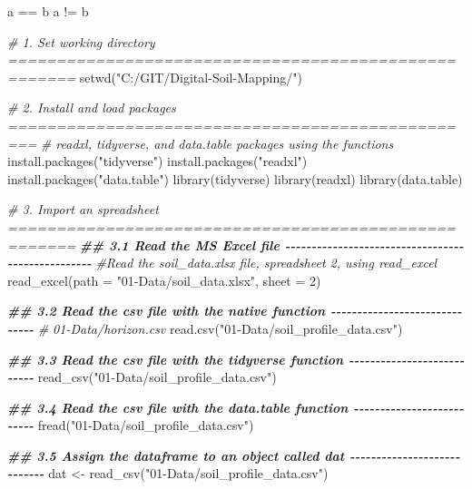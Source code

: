 \documentclass[
  10pt,
  b5paper,
  oneside]{book}
\newenvironment{Shaded}{\begin{snugshade}}{\end{snugshade}}
\newcommand{\AttributeTok}[1]{\textcolor[rgb]{0.77,0.63,0.00}{#1}}
\newcommand{\CommentTok}[1]{\textcolor[rgb]{0.56,0.35,0.01}{\textit{#1}}}
\newcommand{\DecValTok}[1]{\textcolor[rgb]{0.00,0.00,0.81}{#1}}
\newcommand{\DocumentationTok}[1]{\textcolor[rgb]{0.56,0.35,0.01}{\textbf{\textit{#1}}}}
\newcommand{\FunctionTok}[1]{\textcolor[rgb]{0.00,0.00,0.00}{#1}}
\newcommand{\NormalTok}[1]{#1}
\newcommand{\OtherTok}[1]{\textcolor[rgb]{0.56,0.35,0.01}{#1}}
\newcommand{\SpecialCharTok}[1]{\textcolor[rgb]{0.00,0.00,0.00}{#1}}
\newcommand{\StringTok}[1]{\textcolor[rgb]{0.31,0.60,0.02}{#1}}
\begin{document}
\begin{Shaded}
\begin{Highlighting}[]
\NormalTok{a }\SpecialCharTok{==}\NormalTok{ b}
\NormalTok{a }\SpecialCharTok{!=}\NormalTok{ b}

\CommentTok{\# 1. Set working directory ===================================================== }
\FunctionTok{setwd}\NormalTok{(}\StringTok{"C:/GIT/Digital{-}Soil{-}Mapping/"}\NormalTok{)}

\CommentTok{\# 2. Install and load packages =================================================}
\CommentTok{\# readxl, tidyverse, and data.table packages using the functions}
\FunctionTok{install.packages}\NormalTok{(}\StringTok{"tidyverse"}\NormalTok{)}
\FunctionTok{install.packages}\NormalTok{(}\StringTok{"readxl"}\NormalTok{)}
\FunctionTok{install.packages}\NormalTok{(}\StringTok{"data.table"}\NormalTok{)}
\FunctionTok{library}\NormalTok{(tidyverse)}
\FunctionTok{library}\NormalTok{(readxl)}
\FunctionTok{library}\NormalTok{(data.table)}

\CommentTok{\# 3. Import an spreadsheet =====================================================}
\DocumentationTok{\#\# 3.1 Read the MS Excel file {-}{-}{-}{-}{-}{-}{-}{-}{-}{-}{-}{-}{-}{-}{-}{-}{-}{-}{-}{-}{-}{-}{-}{-}{-}{-}{-}{-}{-}{-}{-}{-}{-}{-}{-}{-}{-}{-}{-}{-}{-}{-}{-}{-}{-}{-}{-}{-}{-}{-}}
\CommentTok{\#Read the soil\_data.xlsx file, spreadsheet 2, using read\_excel }
\FunctionTok{read\_excel}\NormalTok{(}\AttributeTok{path =} \StringTok{"01{-}Data/soil\_data.xlsx"}\NormalTok{, }\AttributeTok{sheet =} \DecValTok{2}\NormalTok{)}

\DocumentationTok{\#\# 3.2 Read the csv file with the native function {-}{-}{-}{-}{-}{-}{-}{-}{-}{-}{-}{-}{-}{-}{-}{-}{-}{-}{-}{-}{-}{-}{-}{-}{-}{-}{-}{-}{-}{-}}
\CommentTok{\# 01{-}Data/horizon.csv}
\FunctionTok{read.csv}\NormalTok{(}\StringTok{"01{-}Data/soil\_profile\_data.csv"}\NormalTok{)}

\DocumentationTok{\#\# 3.3 Read the csv file with the tidyverse function {-}{-}{-}{-}{-}{-}{-}{-}{-}{-}{-}{-}{-}{-}{-}{-}{-}{-}{-}{-}{-}{-}{-}{-}{-}{-}{-}}
\FunctionTok{read\_csv}\NormalTok{(}\StringTok{"01{-}Data/soil\_profile\_data.csv"}\NormalTok{)}

\DocumentationTok{\#\# 3.4 Read the csv file with the data.table function {-}{-}{-}{-}{-}{-}{-}{-}{-}{-}{-}{-}{-}{-}{-}{-}{-}{-}{-}{-}{-}{-}{-}{-}{-}{-}}
\FunctionTok{fread}\NormalTok{(}\StringTok{"01{-}Data/soil\_profile\_data.csv"}\NormalTok{)}

\DocumentationTok{\#\# 3.5 Assign the dataframe to an object called dat {-}{-}{-}{-}{-}{-}{-}{-}{-}{-}{-}{-}{-}{-}{-}{-}{-}{-}{-}{-}{-}{-}{-}{-}{-}{-}{-}{-}}
\NormalTok{dat }\OtherTok{\textless{}{-}} \FunctionTok{read\_csv}\NormalTok{(}\StringTok{"01{-}Data/soil\_profile\_data.csv"}\NormalTok{)}


\end{Highlighting}
\end{Shaded}
\end{document}
